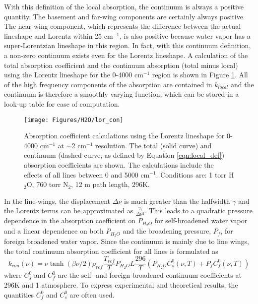 \documentclass[11pt]{article}
\begin{document}
With this definition of the local absorption, the continuum is always a 
positive quantity.  The basement and far-wing
components are certainly always positive.  The near-wing component, which
represents the difference between the actual lineshape and Lorentz within
25 cm$^{-1}$, is also positive because water vapor has a super-Lorentzian
lineshape in this region. In fact, with this continuum definition, a 
non-zero continuum exists even for the Lorentz lineshape.
A calculation of the total absorption coefficient and the continuum 
absorption (total minus local) using the Lorentz lineshape for the 
0-4000 cm$^{-1}$ region is shown
in Figure \ref{fig:lor_con}.  All of the high frequency components of the
absorption are contained in $k_{local}$ and the continuum is therefore a 
smoothly varying function, which can be stored in a look-up table for ease 
of computation.

\begin{figure}
\begin{center}
\texttt{[image: Figures/H2O/lor\_con]}\end{center}
\caption[Lorentz calculations for 0-4000 cm$^{-1}$.]{Absorption coefficient
	calculations using the Lorentz lineshape for 0-4000 cm$^{-1}$ at
	$\sim$2 cm$^{-1}$ resolution.  The total
	(solid curve) and continuum (dashed curve, as defined by Equation 
	\protect\ref{eqn:local_def}) absorption coefficients are shown.  The
calculations include the effects of all lines between 0 and 5000 cm$^{-1}$.
Conditions are: 1 torr H$_2$O, 760 torr N$_2$, 12 m path length, 296K.}
\label{fig:lor_con}
\end{figure}

In the line-wings, the displacement $\Delta\nu$ is much greater than the
halfwidth $\gamma$ and the Lorentz terms can be approximated as 
$\frac{\gamma_i}{\Delta\nu^2}$.  This leads to a quadratic pressure
dependence in the absorption coefficient on $P_{H_2O}$ for self-broadened 
water vapor and a linear dependence on both $P_{H_2O}$ and the broadening 
pressure, $P_f$, for foreign broadened water vapor.  Since the continuum 
is mainly due to line wings, the total continuum absorption coefficient 
for all lines is formulated as \cite{bur:81,clo:89}
\begin{equation}
k_{con}(\nu)=\nu\tanh\left(\beta\nu/2\right) \rho_{ref}
\frac{T_{ref}}{T}P_{H_{2}O}L
\frac{296}{T}\left(P_{H_{2}O} C_s^0(\nu,T) + P_{f} C_f^0(\nu,T)\right)
\label{eqn:kcon}
\end{equation}
where $C_s^0$ and $C_f^0$ are the self- and foreign-broadened 
continuum coefficients at 296K and 1 atmosphere.  To express experimental
and theoretical results, the quantities $C_f^0$ and $C_s^0$ are often used.
\end{document}
